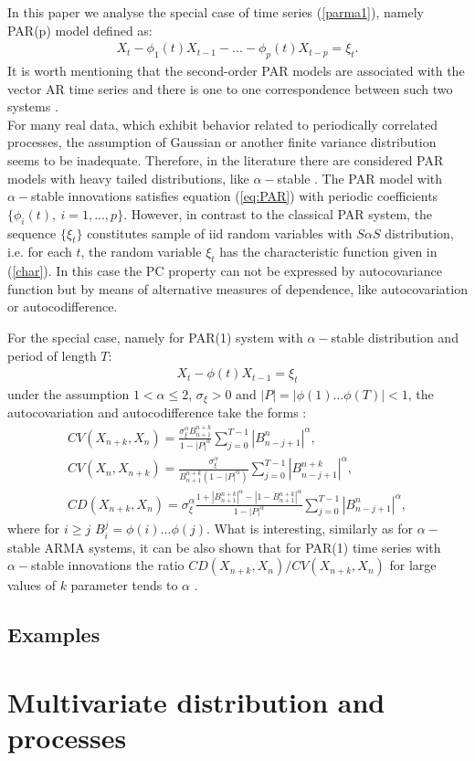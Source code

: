 In this paper we analyse the special case of time series (\ref{parma1}), namely PAR(p) model defined as:
\begin{eqnarray}\label{eq:PAR}
X_t-\phi_1(t)X_{t-1}-...-\phi_p(t)X_{t-p}=\xi_{t}.
\end{eqnarray}
It is worth mentioning that the second-order PAR models are associated with the vector AR time series and there is one to one correspondence between such two systems \cite{wylomanska2008spectral,hurd2007periodically}.\\
For many real data, which exhibit behavior related to periodically correlated processes, the assumption of Gaussian or another finite variance distribution seems to be inadequate. Therefore, in the literature there are considered PAR models with heavy tailed distributions, like $\alpha-$stable \cite{nowicka2006dependence}. The PAR model with $\alpha-$stable innovations satisfies equation (\ref{eq:PAR}) with periodic coefficients $\{\phi_i(t),~i=1,...,p\}$. However, in contrast to the classical PAR system, the sequence $\{\xi_t\}$ constitutes sample of iid random variables with $S\alpha S$ distribution, i.e. for each $t$, the random variable $\xi_t$ has the characteristic function given in (\ref{char}). In this case the PC property can not be expressed by autocovariance function but by means of alternative measures of dependence, like autocovariation or autocodifference.

For the special case, namely for PAR(1) system with $\alpha-$stable distribution and period of length $T$:
\begin{eqnarray*}
X_t-\phi(t)X_{t-1}=\xi_t
\end{eqnarray*}
under the assumption $1<\alpha \leq 2$, $\sigma_{\xi}>0$ and $|P|=|\phi(1)...\phi(T)|<1$, the autocovariation and autocodifference take the forms \cite{nowicka2006dependence}:
\begin{eqnarray*}
\label{par1_cd}CV(X_{n+k},X_{n})=\frac{\sigma_{\xi}^{\alpha}B_{n+1}^{n+k}}{1-|P|^{\alpha}}\sum_{j=0}^{T-1}|B_{n-j+1}^n|^{\alpha},\\
CV(X_n,X_{n+k})=\frac{\sigma_{\xi}^{\alpha}}{B_{n+1}^{n+k}(1-|P|^{\alpha})}\sum_{j=0}^{T-1}|B_{n-j+1}^{n+k}|^{\alpha},\\
CD(X_{n+k},X_n)=\sigma_{\xi}^{\alpha}\frac{1+|B_{n+1}^{n+k}|^{\alpha}-|1-B_{n+1}^{n+k}|^{\alpha}}{1-|P|^{\alpha}}\sum_{j=0}^{T-1}|B_{n-j+1}^n|^{\alpha},
\end{eqnarray*}
where for $i\geq j$  $B_{i}^{j}=\phi(i)...\phi(j)$. What is interesting, similarly as for $\alpha-$stable ARMA systems, it can be also shown that for PAR(1) time series with $\alpha-$stable innovations the ratio $CD(X_{n+k},X_n)/CV(X_{n+k},X_n)$ for large values of $k$ parameter tends to $\alpha$ \cite{nw2}.
\subsection{Examples}
\section{Multivariate \stab distribution and processes}